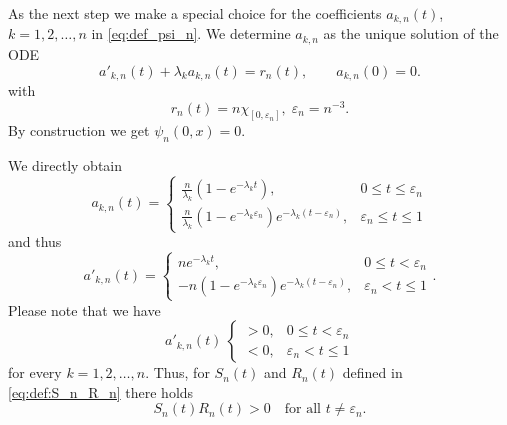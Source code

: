 \documentclass{m2an}
\newcommand{\1}{\mathds{1}}
\theoremstyle{definition}
\begin{document}
As the next step we make a special choice for the coefficients $a_{k,n}(t)$, $k=1,2,\dots,n$ in \eqref{eq:def_psi_n}. We determine $a_{k,n}$ as the unique solution of the ODE
\[
 a'_{k,n}(t)+\lambda_k a_{k,n}(t)=r_n(t),\qquad a_{k,n}(0)=0.
\]
with 
\[
r_n(t) = n \chi_{[0,\varepsilon_n]}, \; \varepsilon_n = n^{-3}.
\]
By construction we get $\psi_n(0,x) =0$.

We directly obtain
\[
a_{k,n}(t) = 
\begin{cases}
	\frac{n}{\lambda_k}(1-e^{-\lambda_k t}), & 0 \le t \le \varepsilon_n\\
	\frac{n}{\lambda_k}(1-e^{-\lambda_k \varepsilon_n})e^{-\lambda_k(t-\varepsilon_n)}, & \varepsilon_n \le t \le 1
\end{cases}
\]
and thus
\[
a'_{k,n}(t) = 
\begin{cases}
	ne^{-\lambda_k t}, & 0 \le t < \varepsilon_n\\
	-n(1-e^{-\lambda_k \varepsilon_n})e^{-\lambda_k(t-\varepsilon_n)}, & \varepsilon_n < t \le 1
\end{cases}
.
\]
Please note that we have
\[
a'_{k,n}(t)  \
\begin{cases}
	>0, & 0 \le t < \varepsilon_n\\
	<0, & \varepsilon_n < t \le 1
\end{cases}
\]
for every $k=1,2,\dots,n$. Thus, for $S_n(t)$ and $R_n(t)$ defined in \eqref{eq:def:S_n_R_n} there holds
\begin{equation}\label{eq:SR_positive}
S_n(t) R_n(t) >0 \quad \text{for all } t \neq \varepsilon_n.
\end{equation}
\end{document}

